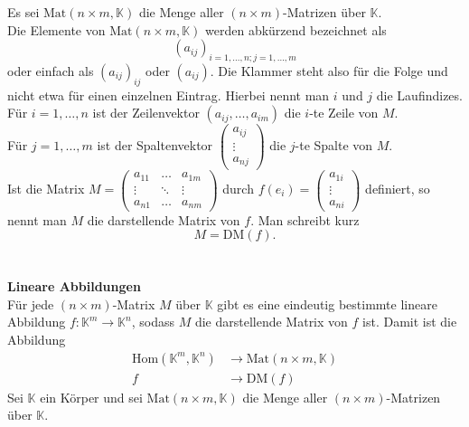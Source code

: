 \documentclass[a4paper,12pt]{article}
\numberwithin{equation}{section}
\begin{document}
Es sei $\text{Mat}\left(n\times m,\mathbb{K}\right)$ die Menge aller $\left(n\times m\right)$-Matrizen über $\mathbb{K}$.\\Die Elemente von $\text{Mat}\left(n\times m,\mathbb{K}\right)$ werden abkürzend bezeichnet als
\[ 
        \left(a_{ij}\right)_{i=1,\hdots ,n;j=1,\hdots ,m}
\] 
oder einfach als $\left(a_{ij}\right)_{ij}$ oder $\left(a_{ij}\right)$. Die Klammer steht also für die Folge und nicht etwa für einen einzelnen Eintrag. Hierbei nennt man $i$ und $j$ die Laufindizes.\\Für $i=1,\hdots ,n$ ist der Zeilenvektor $\left(a_{ij},\hdots ,a_{im}\right)$ die $i$-te Zeile von $M$.\\Für $j=1,\hdots ,m$ ist der Spaltenvektor $\left(\begin{matrix}
        a_{ij}\\\vdots\\a_{nj}
\end{matrix}\right)$ die $j$-te Spalte von $M$.\\Ist die Matrix $M=\left(\begin{matrix}
a_{11}&\hdots &a_{1m}\\
\vdots&\ddots &\vdots\\
a_{n1}&\hdots &a_{nm}
\end{matrix}\right)$ durch $f\left(e_i\right)=\left(\begin{matrix}
        a_{1i}\\\vdots\\a_{n i}
\end{matrix}\right)$ definiert, so nennt man $M$ die darstellende Matrix von $f$. Man schreibt kurz
\[ 
        M=\text{DM}\left(f\right)
.\] 
\\\hfill\\\textbf{Lineare Abbildungen}\\ 
Für jede $\left(n\times m\right)$-Matrix $M$ über $\mathbb{K}$ gibt es eine eindeutig bestimmte lineare Abbildung $f:\mathbb{K}^{m}\rightarrow \mathbb{K}^{n}$, sodass $M$ die darstellende Matrix von $f$ ist. Damit ist die Abbildung
\begin{align*}
        \text{Hom}\left(\mathbb{K}^{m},\mathbb{K}^{n}\right)&\rightarrow \text{Mat}\left(n\times m,\mathbb{K}\right)\\
        f&\rightarrow \text{DM}\left(f\right)
\end{align*}
Sei $\mathbb{K}$ ein Körper und sei $\text{Mat}\left(n\times m,\mathbb{K}\right)$ die Menge aller $\left(n\times m\right)$-Matrizen über $\mathbb{K}$.
\end{document}
